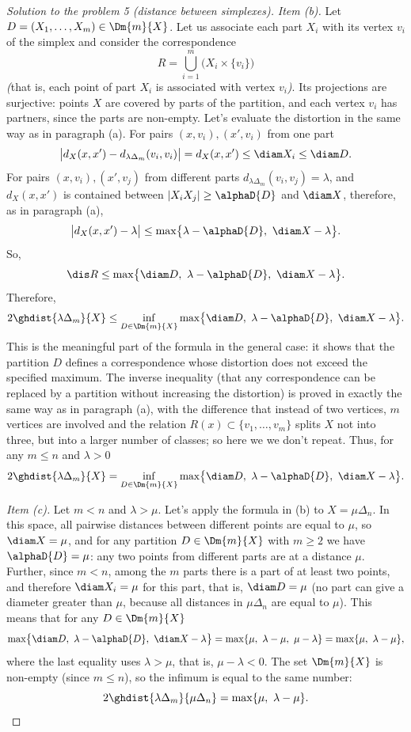\documentclass[a4paper,12pt]{report}
\begin{document}
\begin{proof}[Solution to the problem \textup{5} \textup{(}distance between simplexes\textup{)}]
\textit{Item \textup{(b)}.} Let $D=(X_1,\dots,X_m)\in\Dm{m}{X}$. Let us associate each part $X_i$ with its vertex $v_i$ of the simplex and consider the correspondence
\[
R=\bigcup_{i=1}^{m}\bigl(X_i\times\{v_i\}\bigr)
\]
\emph{\textup{(}}that is, each point of part $X_i$ is associated with vertex $v_i$\emph{\textup{)}}. Its projections are surjective\textup{:} points $X$ are covered by parts of the partition, and each vertex $v_i$ has partners, since the parts are non-empty. Let's evaluate the distortion in the same way as in paragraph \textup{(a)}. For pairs $(x,v_i),(x',v_i)$ from one part
\[
\bigl|d_X(x,x')-d_{\lambda\Delta_m}(v_i,v_i)\bigr|=d_X(x,x')\le\diam X_i\le\diam D .
\]
For pairs $(x,v_i),(x',v_j)$ from different parts $d_{\lambda\Delta_m}(v_i,v_j)=\lambda$, and $d_X(x,x')$ is contained between $|X_iX_j|\ge\alphaD{D}$ and $\diam X$, therefore, as in paragraph \textup{(a)},
\[
\bigl|d_X(x,x')-\lambda\bigr|\le\max\bigl\{\lambda-\alphaD{D},\ \diam X-\lambda\bigr\} .
\]
So,
\[
\dis R\le\max\bigl\{\diam D,\ \lambda-\alphaD{D},\ \diam X-\lambda\bigr\} .
\]
Therefore,
\[
2\ghdist{\lambda\Delta_m}{X}\le\inf_{D\in\Dm{m}{X}}\max\bigl\{\diam D,\ \lambda-\alphaD{D},\ \diam X-\lambda\bigr\} .
\]
This is the meaningful part of the formula in the general case\textup{:} it shows that the partition $D$ defines a correspondence whose distortion does not exceed the specified maximum. The inverse inequality \textup{(}that any correspondence can be replaced by a partition without increasing the distortion\textup{)} is proved in exactly the same way as in paragraph \textup{(a)}, with the difference that instead of two vertices, $m$ vertices are involved and the relation $R(x)\subset\{v_1,\dots,v_m\}$ splits $X$ not into three, but into a larger number of classes\textup{;} so here we we don't repeat. Thus, for any $m\le n$ and $\lambda>0$
\[
2\ghdist{\lambda\Delta_m}{X}=\inf_{D\in\Dm{m}{X}}\max\bigl\{\diam D,\ \lambda-\alphaD{D},\ \diam X-\lambda\bigr\} .
\]

\textit{Item \textup{(c)}.} Let $m<n$ and $\lambda>\mu$. Let's apply the formula in \textup{(b)} to $X=\mu\Delta_n$. In this space, all pairwise distances between different points are equal to $\mu$, so $\diam X=\mu$, and for any partition $D\in\Dm{m}{X}$ with $m\ge2$ we have $\alphaD{D}=\mu$\textup{:} any two points from different parts are at a distance $\mu$. Further, since $m<n$, among the $m$ parts there is a part of at least two points, and therefore $\diam X_i=\mu$ for this part, that is, $\diam D=\mu$ \textup{(}no part can give a diameter greater than $\mu$, because all distances in $\mu\Delta_n$ are equal to $\mu$\textup{)}. This means that for any $D\in\Dm{m}{X}$
\[
\max\bigl\{\diam D,\ \lambda-\alphaD{D},\ \diam X-\lambda\bigr\}=\max\{\mu,\ \lambda-\mu,\ \mu-\lambda\}=\max\{\mu,\ \lambda-\mu\} ,
\]
where the last equality uses $\lambda>\mu$, that is, $\mu-\lambda<0$. The set $\Dm{m}{X}$ is non-empty \textup{(}since $m\le n$\textup{)}, so the infimum is equal to the same number\textup{:}
\[
2\ghdist{\lambda\Delta_m}{\mu\Delta_n}=\max\{\mu,\ \lambda-\mu\} .
\]


\end{proof}
\end{document}
